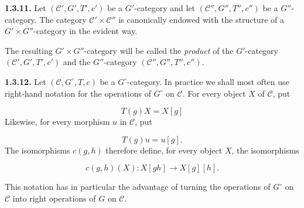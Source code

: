 \noindent\textbf{1.3.11.}\quad
Let $(\mathcal C',G',T',c')$ be a $G'$-category and let
$(\mathcal C'',G'',T'',c'')$ be a $G''$-category. The category
$\mathcal C'\times\mathcal C''$ is canonically endowed with the
structure of a $G'\times G''$-category in the evident way.

The resulting $G'\times G''$-category will be called the
\emph{product} of the $G'$-category $(\mathcal C',G',T',c')$ and the
$G''$-category $(\mathcal C'',G'',T'',c'')$.

\noindent\textbf{1.3.12.}\quad
Let $(\mathcal C,G^\circ,T,c)$ be a $G^\circ$-category. In practice we
shall most often use right-hand notation for the operations of
$G^\circ$ on $\mathcal C$. For every object $X$ of $\mathcal C$, put

\begin{equation}
  T(g)X=X[g]
  \tag{1.3.12.1}
\end{equation}
Likewise, for every morphism $u$ in $\mathcal C$, put

\begin{equation}
  T(g)u=u[g].
  \tag{1.3.12.2}
\end{equation}
The isomorphisms $c(g,h)$ therefore define, for every object $X$, the
isomorphisms

\begin{equation}
  c(g,h)(X)\colon X[gh]\longrightarrow X[g][h].
  \tag{1.3.12.3}
\end{equation}

This notation has in particular the advantage of turning the
operations of $G^\circ$ on $\mathcal C$ into right operations of $G$
on $\mathcal C$.
